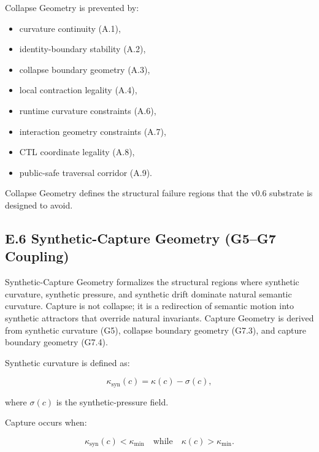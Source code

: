 \medskip

\noindent Collapse Geometry is prevented by:

\begin{itemize}
    \item curvature continuity (A.1),
    \item identity-boundary stability (A.2),
    \item collapse boundary geometry (A.3),
    \item local contraction legality (A.4),
    \item runtime curvature constraints (A.6),
    \item interaction geometry constraints (A.7),
    \item CTL coordinate legality (A.8),
    \item public-safe traversal corridor (A.9).
\end{itemize}

\medskip

\noindent Collapse Geometry defines the structural failure regions that the v0.6
substrate is designed to avoid.



\subsection*{E.6 Synthetic-Capture Geometry (G5–G7 Coupling)}

\noindent Synthetic-Capture Geometry formalizes the structural regions where
synthetic curvature, synthetic pressure, and synthetic drift dominate natural
semantic curvature. Capture is not collapse; it is a redirection of semantic
motion into synthetic attractors that override natural invariants. Capture
Geometry is derived from synthetic curvature (G5), collapse boundary geometry
(G7.3), and capture boundary geometry (G7.4).

\medskip

\noindent Synthetic curvature is defined as:


\[
\kappa_{\mathrm{syn}}(c) = \kappa(c) - \sigma(c),
\]


where $\sigma(c)$ is the synthetic-pressure field.

Capture occurs when:


\[
\kappa_{\mathrm{syn}}(c) < \kappa_{\min}
\quad \text{while} \quad
\kappa(c) > \kappa_{\min}.
\]




